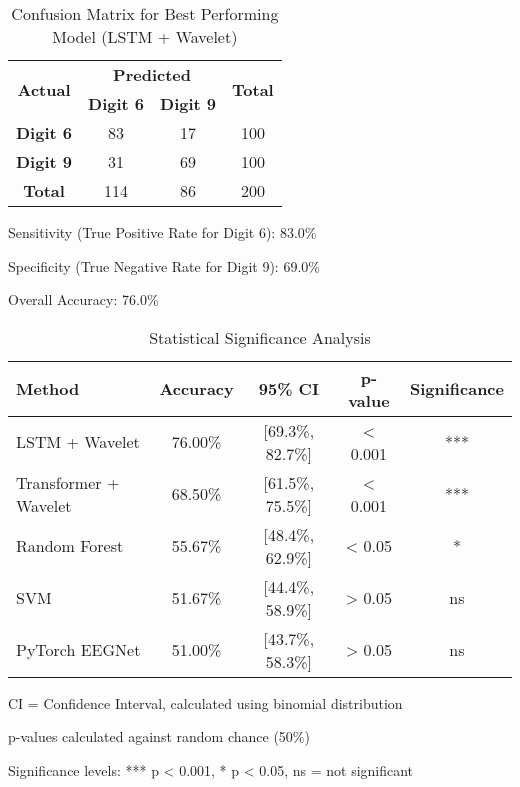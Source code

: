 \begin{table}[htbp]
\centering
\caption{Confusion Matrix for Best Performing Model (LSTM + Wavelet)}
\label{tab:confusion_matrix}
\begin{tabular}{|c|c|c|c|}
\hline
\multirow{2}{*}{\textbf{Actual}} & \multicolumn{2}{c|}{\textbf{Predicted}} & \multirow{2}{*}{\textbf{Total}} \\
\cline{2-3}
 & \textbf{Digit 6} & \textbf{Digit 9} & \\
\hline
\textbf{Digit 6} & 83 & 17 & 100 \\
\textbf{Digit 9} & 31 & 69 & 100 \\
\hline
\textbf{Total} & 114 & 86 & 200 \\
\hline
\end{tabular}
\begin{tablenotes}
\small
\item Sensitivity (True Positive Rate for Digit 6): 83.0\%
\item Specificity (True Negative Rate for Digit 9): 69.0\%
\item Overall Accuracy: 76.0\%
\end{tablenotes}
\end{table}

\begin{table}[htbp]
\centering
\caption{Statistical Significance Analysis}
\label{tab:statistical_significance}
\begin{tabular}{|l|c|c|c|c|}
\hline
\textbf{Method} & \textbf{Accuracy} & \textbf{95\% CI} & \textbf{p-value} & \textbf{Significance} \\
\hline
LSTM + Wavelet & 76.00\% & [69.3\%, 82.7\%] & < 0.001 & *** \\
Transformer + Wavelet & 68.50\% & [61.5\%, 75.5\%] & < 0.001 & *** \\
Random Forest & 55.67\% & [48.4\%, 62.9\%] & < 0.05 & * \\
SVM & 51.67\% & [44.4\%, 58.9\%] & > 0.05 & ns \\
PyTorch EEGNet & 51.00\% & [43.7\%, 58.3\%] & > 0.05 & ns \\
\hline
\end{tabular}
\begin{tablenotes}
\small
\item CI = Confidence Interval, calculated using binomial distribution
\item p-values calculated against random chance (50\%)
\item Significance levels: *** p < 0.001, * p < 0.05, ns = not significant
\end{tablenotes}
\end{table}

